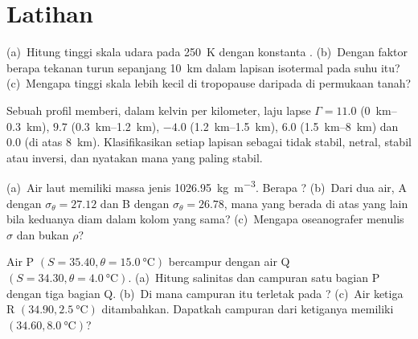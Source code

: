 \section{Latihan}

\begin{exercise}[$\star$]\label{exo:b1:fluid-envelopes-structure:1}
(a)~Hitung tinggi skala udara pada \qty{250}{K} dengan konstanta .
(b)~Dengan faktor berapa tekanan turun sepanjang \qty{10}{km} dalam lapisan isotermal
pada suhu itu? (c)~Mengapa tinggi skala lebih kecil di tropopause daripada di
permukaan tanah?
\end{exercise}

\begin{exercise}[$\star$]\label{exo:b1:fluid-envelopes-structure:2}
Sebuah profil memberi, dalam kelvin per kilometer, laju lapse $\Gamma = 11.0$
(\qtyrange{0}{0.3}{km}), $9.7$ (\qtyrange{0.3}{1.2}{km}), $-4.0$
(\qtyrange{1.2}{1.5}{km}), $6.0$ (\qtyrange{1.5}{8}{km}) dan $0.0$ (di atas
\qty{8}{km}). Klasifikasikan setiap lapisan sebagai tidak stabil, netral, stabil atau
inversi, dan nyatakan mana yang paling stabil.
\end{exercise}

\begin{exercise}[$\star$]\label{exo:b1:fluid-envelopes-structure:3}
(a)~Air laut memiliki massa jenis \qty{1026.95}{kg.m^{-3}}. Berapa ? (b)~Dari
dua air, A dengan $\sigma_\theta = 27.12$ dan B dengan $\sigma_\theta = 26.78$, mana
yang berada di atas yang lain bila keduanya diam dalam kolom yang sama? (c)~Mengapa
oseanografer menulis $\sigma$ dan bukan $\rho$?
\end{exercise}

\begin{exercise}[$\star$]\label{exo:b1:fluid-envelopes-structure:4}
Air P $(S = 35.40, \theta = \qty{15.0}{\celsius})$ bercampur dengan air Q $(S =
34.30, \theta = \qty{4.0}{\celsius})$. (a)~Hitung salinitas dan  campuran
satu bagian P dengan tiga bagian Q. (b)~Di mana campuran itu terletak pada ? (c)~Air ketiga R $(34.90,
\qty{2.5}{\celsius})$ ditambahkan. Dapatkah campuran dari ketiganya memiliki
$(34.60, \qty{8.0}{\celsius})$?
\end{exercise}

